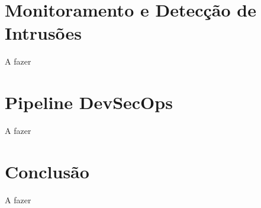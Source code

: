 \documentclass[12pt]{article}
\begin{document}
    \section{Monitoramento e Detecção de Intrusões}
    \label{sec:monitoramento}

    A fazer

    \section{Pipeline DevSecOps}
    \label{sec:devsecops}

    A fazer

    \section{Conclusão}
    \label{sec:conclusao}

    A fazer

    
    
\end{document}
